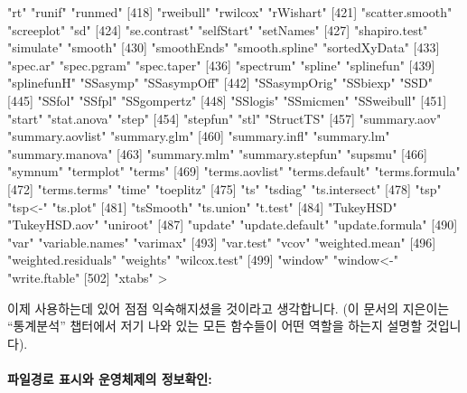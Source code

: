 \documentclass[tutorial.tex]{subfiles}
\begin{document}
\begin{Schunk}
\begin{Soutput}
[415] "rt"                   "runif"                "runmed"              
[418] "rweibull"             "rwilcox"              "rWishart"            
[421] "scatter.smooth"       "screeplot"            "sd"                  
[424] "se.contrast"          "selfStart"            "setNames"            
[427] "shapiro.test"         "simulate"             "smooth"              
[430] "smoothEnds"           "smooth.spline"        "sortedXyData"        
[433] "spec.ar"              "spec.pgram"           "spec.taper"          
[436] "spectrum"             "spline"               "splinefun"           
[439] "splinefunH"           "SSasymp"              "SSasympOff"          
[442] "SSasympOrig"          "SSbiexp"              "SSD"                 
[445] "SSfol"                "SSfpl"                "SSgompertz"          
[448] "SSlogis"              "SSmicmen"             "SSweibull"           
[451] "start"                "stat.anova"           "step"                
[454] "stepfun"              "stl"                  "StructTS"            
[457] "summary.aov"          "summary.aovlist"      "summary.glm"         
[460] "summary.infl"         "summary.lm"           "summary.manova"      
[463] "summary.mlm"          "summary.stepfun"      "supsmu"              
[466] "symnum"               "termplot"             "terms"               
[469] "terms.aovlist"        "terms.default"        "terms.formula"       
[472] "terms.terms"          "time"                 "toeplitz"            
[475] "ts"                   "tsdiag"               "ts.intersect"        
[478] "tsp"                  "tsp<-"                "ts.plot"             
[481] "tsSmooth"             "ts.union"             "t.test"              
[484] "TukeyHSD"             "TukeyHSD.aov"         "uniroot"             
[487] "update"               "update.default"       "update.formula"      
[490] "var"                  "variable.names"       "varimax"             
[493] "var.test"             "vcov"                 "weighted.mean"       
[496] "weighted.residuals"   "weights"              "wilcox.test"         
[499] "window"               "window<-"             "write.ftable"        
[502] "xtabs"               
> 
\end{Soutput}
\end{Schunk}

이제 사용하는데 있어 점점 익숙해지셨을 것이라고 생각합니다. (이 문서의 지은이는 ``통계분석'' 챕터에서 저기 나와 있는 모든 함수들이 어떤 역할을 하는지 설명할 것입니다).

\paragraph{파일경로 표시와 운영체제의 정보확인: }
\end{document}
